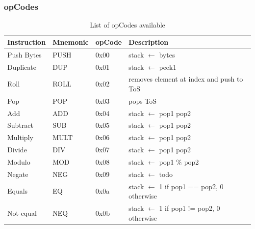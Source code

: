 \subsubsection{opCodes}
\begin{table}[]
\centering
\caption{List of opCodes available}
\label{opcodes cheat sheet}
\begin{tabular}{@{}llll@{}}
\toprule
\textbf{Instruction} & \textbf{Mnemonic} & \textbf{opCode} & \textbf{Description}                                     \\ \midrule
Push Bytes           & PUSH              & 0x00            & stack $\leftarrow$ bytes                                            \\
Duplicate            & DUP               & 0x01            & stack $\leftarrow$ peek1                           \\
Roll                 & ROLL              & 0x02            & removes element at index and push to ToS           \\
Pop                  & POP               & 0x03            & pops ToS                                                 \\
Add                  & ADD               & 0x04            & stack $\leftarrow$ pop1 \+ pop2                                      \\
Subtract             & SUB               & 0x05            & stack $\leftarrow$ pop1 \- pop2                                      \\
Multiply             & MULT              & 0x06            & stack $\leftarrow$ pop1 \* pop2                                      \\
Divide               & DIV               & 0x07            & stack $\leftarrow$ pop1 \/ pop2                                      \\
Modulo               & MOD               & 0x08            & stack $\leftarrow$ pop1 \% pop2                                     \\
Negate               & NEG               & 0x09            & stack $\leftarrow$ todo                                             \\
Equals               & EQ                & 0x0a            & stack $\leftarrow$ 1 if pop1 == pop2, 0 otherwise                   \\
Not equal            & NEQ               & 0x0b            & stack $\leftarrow$ 1 if pop1 != pop2, 0 otherwise                   \\

\end{tabular}
\end{table}
